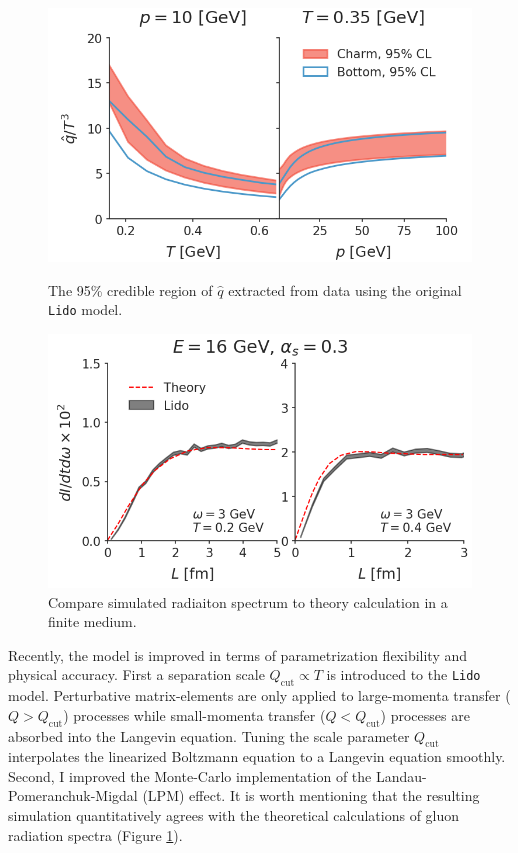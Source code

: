 \documentclass[12pt,a4paper]{revtex4-1}
\begin{document}
\begin{figure}[ht]
\centering
\begin{minipage}{.48\textwidth}
  \centering
  \includegraphics[width=\textwidth]{qhat_p_T.png}
  \caption{The 95\% credible region of $\hat{q}$ extracted from data using the original {\tt Lido} model.}\label{fig:qhat_Ds}
\end{minipage}
\hfill
\begin{minipage}{.48\textwidth}
  \centering
  \includegraphics[width=\textwidth]{spectrum_L.png}
  \caption{Compare simulated radiaiton spectrum to theory calculation \cite{CaronHuot:2010bp} in a finite medium.}\label{fig:spectra}
\end{minipage}
\end{figure}

Recently, the model is improved in terms of parametrization flexibility and physical accuracy. 
First a separation scale $Q_{\textrm{cut}}\propto T$ is introduced to the {\tt Lido} model. 
Perturbative matrix-elements are only applied to large-momenta transfer ($Q > Q_{\textrm{cut}}$) processes while small-momenta transfer ($Q < Q_{\textrm{cut}}$) processes are absorbed into the Langevin equation. 
Tuning the scale parameter $Q_{\textrm{cut}}$ interpolates the linearized Boltzmann equation to a Langevin equation smoothly.
Second, I improved the Monte-Carlo implementation of the Landau-Pomeranchuk-Migdal (LPM) effect.
It is worth mentioning that the resulting simulation quantitatively agrees with the theoretical calculations of gluon radiation spectra (Figure \ref{fig:spectra}).
\end{document}
